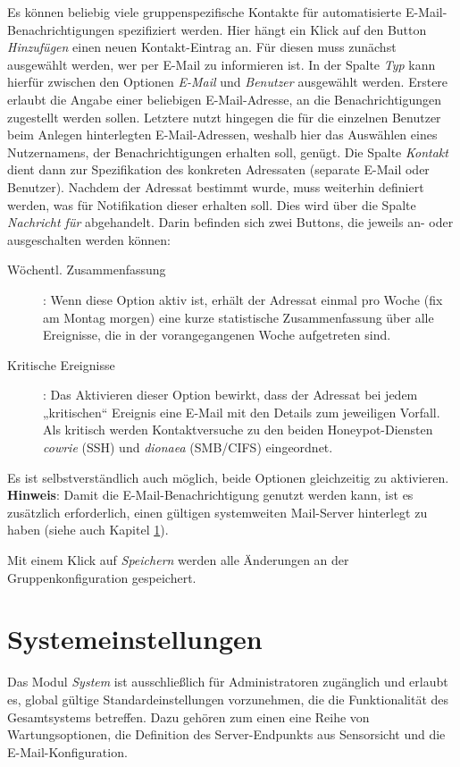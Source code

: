 \documentclass[12pt]{article}
\begin{document}
Es können beliebig viele gruppenspezifische Kontakte für automatisierte E-Mail-Benachrichtigungen spezifiziert werden. Hier hängt ein Klick auf den Button \textit{Hinzufügen} einen neuen Kontakt-Eintrag an. Für diesen muss zunächst ausgewählt werden, wer per E-Mail zu informieren ist. In der Spalte \textit{Typ} kann hierfür zwischen den Optionen \textit{E-Mail} und \textit{Benutzer} ausgewählt werden. Erstere erlaubt die Angabe einer beliebigen E-Mail-Adresse, an die Benachrichtigungen zugestellt werden sollen. Letztere nutzt hingegen die für die einzelnen Benutzer beim Anlegen hinterlegten E-Mail-Adressen, weshalb hier das Auswählen eines Nutzernamens, der Benachrichtigungen erhalten soll, genügt. Die Spalte \textit{Kontakt} dient dann zur Spezifikation des konkreten Adressaten (separate E-Mail oder Benutzer). Nachdem der Adressat bestimmt wurde, muss weiterhin definiert werden, was für Notifikation dieser erhalten soll. Dies wird über die Spalte \textit{Nachricht für} abgehandelt. Darin befinden sich zwei Buttons, die jeweils an- oder ausgeschalten werden können:
\begin{description}
				\item[Wöchentl. Zusammenfassung]: Wenn diese Option aktiv ist, erhält der Adressat einmal pro Woche (fix am Montag morgen) eine kurze statistische Zusammenfassung über alle Ereignisse, die in der vorangegangenen Woche aufgetreten sind.
				\item[Kritische Ereignisse]: Das Aktivieren dieser Option bewirkt, dass der Adressat bei jedem „kritischen“ Ereignis eine E-Mail mit den Details zum jeweiligen Vorfall. Als kritisch werden Kontaktversuche zu den beiden Honeypot-Diensten \textit{cowrie} (SSH) und \textit{dionaea} (SMB/CIFS) eingeordnet.
\end{description}
Es ist selbstverständlich auch möglich, beide Optionen gleichzeitig zu aktivieren. \textbf{Hinweis}: Damit die E-Mail-Benachrichtigung genutzt werden kann, ist es zusätzlich erforderlich, einen gültigen systemweiten Mail-Server hinterlegt zu haben (siehe auch Kapitel \ref{system-settings}).

Mit einem Klick auf \textit{Speichern} werden alle Änderungen an der Gruppenkonfiguration gespeichert.

\section{Systemeinstellungen} \label{system-settings}
Das Modul \textit{System} ist ausschließlich für Administratoren zugänglich und erlaubt es, global gültige Standardeinstellungen vorzunehmen, die die Funktionalität des Gesamtsystems betreffen. Dazu gehören zum einen eine Reihe von Wartungsoptionen, die Definition des Server-Endpunkts aus Sensorsicht und die E-Mail-Konfiguration.
\end{document}
